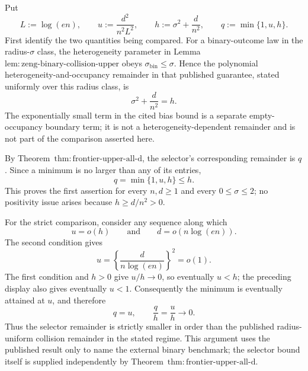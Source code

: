 Put
\[
 L:=\log(en),\qquad
 u:=\frac{d^2}{n^2L^2},\qquad
 h:=\sigma^2+\frac d{n^2},
 \qquad q:=\min\{1,u,h\}.
\]
First identify the two quantities being compared.  For a binary-outcome law in the radius-\(\sigma\) class, the heterogeneity parameter in Lemma~\(\mathrm{lem:zeng\text{-}binary\text{-}collision\text{-}upper}\) obeys \(\sigma_{\mathrm{bin}}\le\sigma\).  Hence the polynomial heterogeneity-and-occupancy remainder in that published guarantee, stated uniformly over this radius class, is
\[
 \sigma^2+\frac d{n^2}=h.
\]
The exponentially small term in the cited bias bound is a separate empty-occupancy boundary term; it is not a heterogeneity-dependent remainder and is not part of the comparison asserted here.

By Theorem~\(\mathrm{thm:frontier\text{-}upper\text{-}all\text{-}d}\), the selector's corresponding remainder is \(q\).  Since a minimum is no larger than any of its entries,
\[
 q=\min\{1,u,h\}\le h.
\]
This proves the first assertion for every \(n,d\ge1\) and every \(0\le\sigma\le2\); no positivity issue arises because \(h\ge d/n^2>0\).

For the strict comparison, consider any sequence along which
\[
 u=o(h)
 \qquad\text{and}\qquad
 d=o\!\left(n\log(en)\right).
\]
The second condition gives
\[
 u=\left\{\frac{d}{n\log(en)}\right\}^2=o(1).
\]
The first condition and \(h>0\) give \(u/h\to0\), so eventually \(u<h\); the preceding display also gives eventually \(u<1\).  Consequently the minimum is eventually attained at \(u\), and therefore
\[
 q=u,
 \qquad
 \frac qh=\frac uh\longrightarrow0.
\]
Thus the selector remainder is strictly smaller in order than the published radius-uniform collision remainder in the stated regime.  This argument uses the published result only to name the external binary benchmark; the selector bound itself is supplied independently by Theorem~\(\mathrm{thm:frontier\text{-}upper\text{-}all\text{-}d}\).